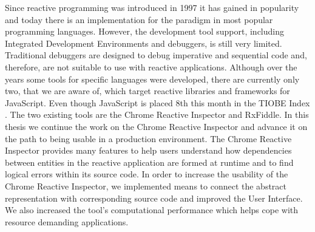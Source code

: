 Since reactive programming was introduced in 1997 it has gained in popularity and today there is an implementation for the paradigm in most popular programming languages. However, the development tool support, including Integrated Development Environments and debuggers, is still very limited. Traditional debuggers are designed to debug imperative and sequential code and, therefore, are not suitable to use with reactive applications. Although over the years some tools for specific languages were developed, there are currently only two, that we are aware of, which target reactive libraries and frameworks for JavaScript. Even though JavaScript is placed 8th this month in the TIOBE Index \cite{LanguageIndex}. The two existing tools are the Chrome Reactive Inspector and RxFiddle.
In this thesis we continue the work on the Chrome Reactive Inspector and advance it on the path to being usable in a production environment. The Chrome Reactive Inspector provides many features to help users understand how dependencies between entities in the reactive application are formed at runtime and to find logical errors within its source code. In order to increase the usability of the Chrome Reactive Inspector, we implemented means to connect the abstract representation with corresponding source code and improved the User Interface. We also increased the tool's computational performance which helps cope with resource demanding applications.
